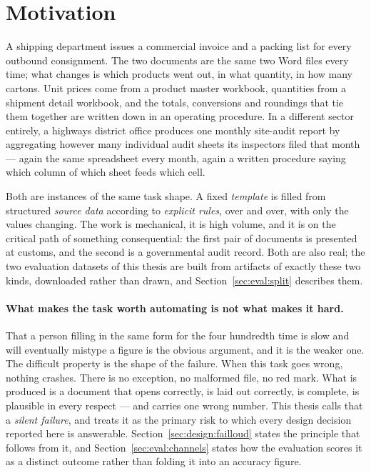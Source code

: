 \section{Motivation}
\label{sec:intro:motivation}

A shipping department issues a commercial invoice and a packing list for every outbound
consignment. The two documents are the same two Word files every time; what changes is
which products went out, in what quantity, in how many cartons. Unit prices come from a
product master workbook, quantities from a shipment detail workbook, and the totals,
conversions and roundings that tie them together are written down in an operating
procedure. In a different sector entirely, a highways district office produces one
monthly site-audit report by aggregating however many individual audit sheets its
inspectors filed that month --- again the same spreadsheet every month, again a written
procedure saying which column of which sheet feeds which cell.

Both are instances of the same task shape. A fixed \emph{template} is filled from
structured \emph{source data} according to \emph{explicit rules}, over and over, with
only the values changing. The work is mechanical, it is high volume, and it is on the
critical path of something consequential: the first pair of documents is presented at
customs, and the second is a governmental audit record. Both are also real; the two
evaluation datasets of this thesis are built from artifacts of exactly these two kinds,
downloaded rather than drawn, and Section~\ref{sec:eval:split} describes them.

\paragraph{What makes the task worth automating is not what makes it hard.}
That a person filling in the same form for the four hundredth time is slow and will
eventually mistype a figure is the obvious argument, and it is the weaker one. The
difficult property is the shape of the failure. When this task goes wrong, nothing
crashes. There is no exception, no malformed file, no red mark. What is produced is a
document that opens correctly, is laid out correctly, is complete, is plausible in every
respect --- and carries one wrong number. This thesis calls that a \emph{silent failure},
and treats it as the primary risk to which every design decision reported here is
answerable. Section~\ref{sec:design:failloud} states the principle that follows from it,
and Section~\ref{sec:eval:channels} states how the evaluation scores it as a distinct
outcome rather than folding it into an accuracy figure.

